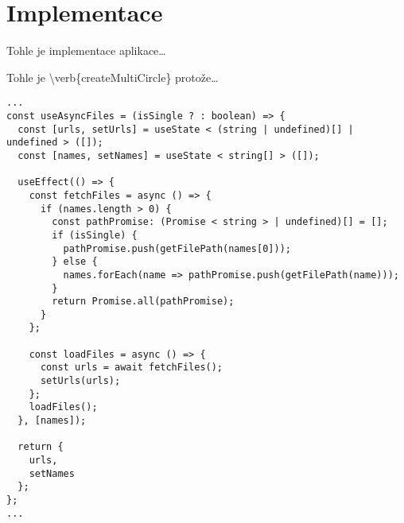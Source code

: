 \hypertarget{implementace}{%
\chapter{Implementace}\label{implementace}}

Tohle je implementace aplikace\ldots{}

Tohle je \textbackslash verb\{createMultiCircle\} protože\ldots{}

\begin{verbatim}
...
const useAsyncFiles = (isSingle ? : boolean) => {
  const [urls, setUrls] = useState < (string | undefined)[] | undefined > ([]);
  const [names, setNames] = useState < string[] > ([]);

  useEffect(() => {
    const fetchFiles = async () => {
      if (names.length > 0) {
        const pathPromise: (Promise < string > | undefined)[] = [];
        if (isSingle) {
          pathPromise.push(getFilePath(names[0]));
        } else {
          names.forEach(name => pathPromise.push(getFilePath(name)));
        }
        return Promise.all(pathPromise);
      }
    };

    const loadFiles = async () => {
      const urls = await fetchFiles();
      setUrls(urls);
    };
    loadFiles();
  }, [names]);

  return {
    urls,
    setNames
  };
};
...
\end{verbatim}
